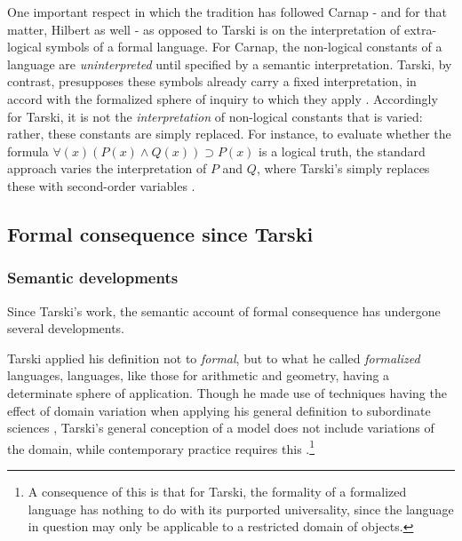 \documentclass[]{article}
\begin{document}
One important respect in which the tradition has followed Carnap - and for that matter, Hilbert as well - as opposed to Tarski is on the interpretation of extra-logical symbols of a formal language. For Carnap, the non-logical constants of a language are \textit{uninterpreted} until specified by a semantic interpretation. Tarski, by contrast, presupposes these symbols already carry a fixed interpretation, in accord with the formalized sphere of inquiry to which they apply \cite[167]{Tarski2002}. Accordingly for Tarski, it is not the \textit{interpretation} of non-logical constants that is varied: rather, these constants are simply replaced. For instance, to evaluate whether the formula $\forall(x)(P(x) \wedge Q(x)) \supset P(x)$ is a logical truth, the standard approach varies the interpretation of $P$ and $Q$, where Tarski's simply replaces these with second-order variables \cite[68-69]{Etchemendy1988}.

\subsection{Formal consequence since Tarski}
\subsubsection{Semantic developments}
Since Tarski's work, the semantic account of formal consequence has undergone several developments. 

Tarski applied his definition not to \textit{formal}, but to what he called \textit{formalized} languages, languages, like those for arithmetic and geometry, having a determinate sphere of application. Though he made use of techniques having the effect of domain variation when applying his general definition to subordinate sciences \cite{Gomez-Torrente2009}, Tarski's general conception of a model does not include variations of the domain, while contemporary practice requires this \cite{Etchemendy1988} \cite{Etchemendy2008}.\footnote{A consequence of this is that for Tarski, the formality of a formalized language has nothing to do with its purported universality, since the language in question may only be applicable to a restricted domain of objects.}
\end{document}
